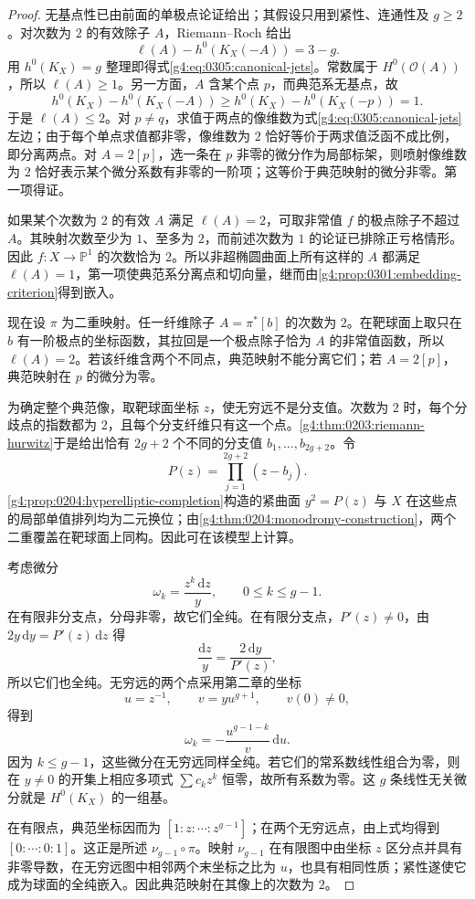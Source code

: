 \begin{proof}
	无基点性已由前面的单极点论证给出；其假设只用到紧性、连通性及 \(g\ge2\)。对次数为 \(2\) 的有效除子 \(A\)，Riemann--Roch 给出
	\[
		\ell(A)-h^0(K_X(-A))=3-g.
	\]
	用 \(h^0(K_X)=g\) 整理即得式\eqref{g4:eq:0305:canonical-jets}。常数属于 \(H^0(\mathcal O(A))\)，所以 \(\ell(A)\ge1\)。另一方面，\(A\) 含某个点 \(p\)，而典范系无基点，故
	\[
		h^0(K_X)-h^0(K_X(-A))
		\ge h^0(K_X)-h^0(K_X(-p))=1.
	\]
	于是 \(\ell(A)\le2\)。对 \(p\ne q\)，求值于两点的像维数为式\eqref{g4:eq:0305:canonical-jets}左边；由于每个单点求值都非零，像维数为 \(2\) 恰好等价于两求值泛函不成比例，即分离两点。对 \(A=2[p]\)，选一条在 \(p\) 非零的微分作为局部标架，则喷射像维数为 \(2\) 恰好表示某个微分系数有非零的一阶项；这等价于典范映射的微分非零。第一项得证。

	如果某个次数为 \(2\) 的有效 \(A\) 满足 \(\ell(A)=2\)，可取非常值 \(f\) 的极点除子不超过 \(A\)。其映射次数至少为 \(1\)、至多为 \(2\)，而前述次数为 \(1\) 的论证已排除正亏格情形。因此 \(f:X\to\mathbb P^1\) 的次数恰为 \(2\)。所以非超椭圆曲面上所有这样的 \(A\) 都满足 \(\ell(A)=1\)，第一项使典范系分离点和切向量，继而由\cref{g4:prop:0301:embedding-criterion}得到嵌入。

	现在设 \(\pi\) 为二重映射。任一纤维除子 \(A=\pi^*[b]\) 的次数为 \(2\)。在靶球面上取只在 \(b\) 有一阶极点的坐标函数，其拉回是一个极点除子恰为 \(A\) 的非常值函数，所以 \(\ell(A)=2\)。若该纤维含两个不同点，典范映射不能分离它们；若 \(A=2[p]\)，典范映射在 \(p\) 的微分为零。

	为确定整个典范像，取靶球面坐标 \(z\)，使无穷远不是分支值。次数为 \(2\) 时，每个分歧点的指数都为 \(2\)，且每个分支纤维只有这一个点。\cref{g4:thm:0203:riemann-hurwitz}于是给出恰有 \(2g+2\) 个不同的分支值 \(b_1,\ldots,b_{2g+2}\)。令
	\[
		P(z)=\prod_{j=1}^{2g+2}(z-b_j).
	\]
	\cref{g4:prop:0204:hyperelliptic-completion}构造的紧曲面 \(y^2=P(z)\) 与 \(X\) 在这些点的局部单值排列均为二元换位；由\cref{g4:thm:0204:monodromy-construction}，两个二重覆盖在靶球面上同构。因此可在该模型上计算。

	考虑微分
	\begin{equation}\label{g4:eq:0305:hyperelliptic-differentials}
		\omega_k=\frac{z^k\,\mathrm{d}z}{y},
		\qquad 0\le k\le g-1.
	\end{equation}
	在有限非分支点，分母非零，故它们全纯。在有限分支点，\(P'(z)\ne0\)，由 \(2y\,\mathrm{d}y=P'(z)\,\mathrm{d}z\) 得
	\[
		\frac{\mathrm{d}z}{y}=\frac{2\,\mathrm{d}y}{P'(z)},
	\]
	所以它们也全纯。无穷远的两个点采用第二章的坐标
	\[
		u=z^{-1},\qquad v=yu^{g+1},\qquad v(0)\ne0,
	\]
	得到
	\[
		\omega_k=-\frac{u^{g-1-k}}{v}\,\mathrm{d}u.
	\]
	因为 \(k\le g-1\)，这些微分在无穷远同样全纯。若它们的常系数线性组合为零，则在 \(y\ne0\) 的开集上相应多项式 \(\sum c_kz^k\) 恒零，故所有系数为零。这 \(g\) 条线性无关微分就是 \(H^0(K_X)\) 的一组基。

	在有限点，典范坐标因而为 \([1:z:\cdots:z^{g-1}]\)；在两个无穷远点，由上式均得到 \([0:\cdots:0:1]\)。这正是所述 \(\nu_{g-1}\circ\pi\)。映射 \(\nu_{g-1}\) 在有限图中由坐标 \(z\) 区分点并具有非零导数，在无穷远图中相邻两个末坐标之比为 \(u\)，也具有相同性质；紧性遂使它成为球面的全纯嵌入。因此典范映射在其像上的次数为 \(2\)。
\end{proof}

